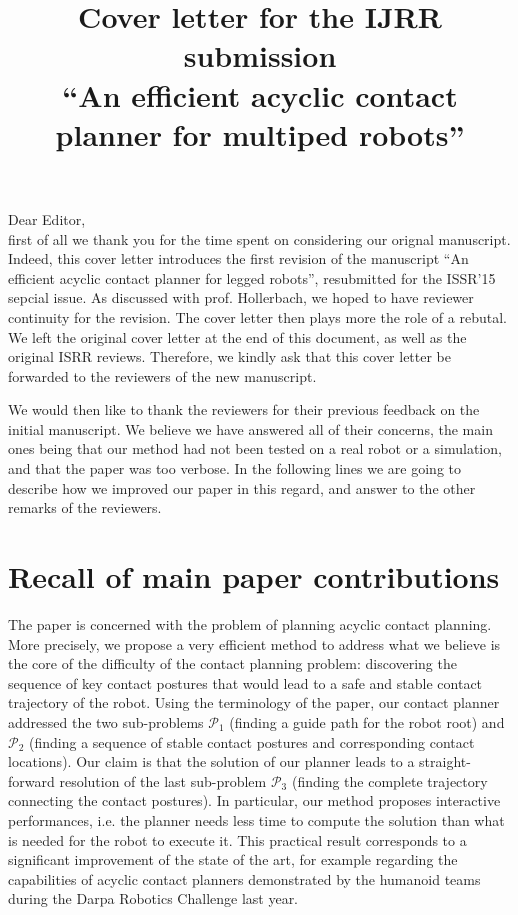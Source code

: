 \documentclass[a4paper]{article}
\author {}
\title {Cover letter for the IJRR submission \\ ``An efficient acyclic contact planner for multiped robots''}
\date {}
\begin{document}
\maketitle

Dear Editor, \\
first of all we thank you for the time spent on considering our orignal manuscript. Indeed,
this cover letter introduces the first revision of the manuscript ``An efficient acyclic contact planner for legged robots'', resubmitted for the ISSR'15 sepcial issue.
As discussed with prof. Hollerbach, we hoped to have reviewer continuity for the revision.
The cover letter then plays more the role of a rebutal. We left the original cover letter at the end of this document, as well as the original ISRR reviews.
Therefore, we kindly ask that this cover letter be forwarded to the reviewers of the new manuscript.

We would then like to thank the reviewers for their previous feedback on the initial manuscript. We believe we have answered
all of their concerns, the main ones being that our method had not been tested on a real robot or a simulation, and that the paper was too verbose.
In the following lines we are going to describe how we improved our paper in this regard, and answer to the other remarks of the reviewers.

\section{Recall of main paper contributions}
The paper is concerned with the problem of planning acyclic contact planning. 
More precisely, we propose a very efficient method to address what we believe is the core of the difficulty of the contact planning problem: discovering the sequence of key contact postures that would lead to a safe and stable contact trajectory of the robot. 
Using the terminology of the paper, our contact planner addressed the two sub-problems $\mathcal{P}_1$ (finding a guide path for the robot root) and $\mathcal{P}_2$ (finding a sequence of stable contact postures and corresponding contact locations).
Our claim is that the solution of our planner leads to a straight-forward resolution of the last sub-problem $\mathcal{P}_3$ (finding the complete trajectory connecting the contact postures).
In particular, our method proposes interactive performances, i.e. the planner needs less time to compute the solution than what is needed for the robot to execute it.
This practical result corresponds to a significant improvement of the state of the art, for example regarding the capabilities of acyclic contact planners demonstrated by the humanoid teams during the Darpa Robotics Challenge last year.
\end{document}
